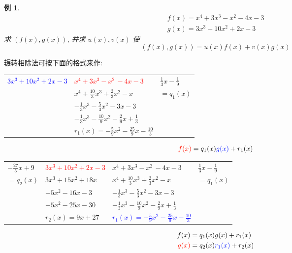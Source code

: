 \documentclass[13pt,fontset=mac]{ctexbeamer}
\newtheorem{exa}{例}
\newcommand{\blue}{\textcolor{blue}}
\newcommand{\red}{\textcolor{red}}
\begin{document}
\begin{frame}
	\begin{exa}
$$
\begin{array}{l}
	f(x)=x^{4}+3 x^{3}-x^{2}-4 x-3 \\
	g(x)=3 x^{3}+10 x^{2}+2 x-3
\end{array}
$$
求 $(f(x), g(x))$, 并求 $u(x), v(x)$ 使
$$
(f(x), g(x))=u(x) f(x)+v(x) g(x)
$$
	\end{exa}
\end{frame}


\begin{frame}
辗转相除法可按下面的格式来作:
	\begin{center}
		\renewcommand\arraystretch{1.3}
		\begin{tabular}{R{3cm} |R{4cm}|L{1.5cm}}
			\blue{$3x^3+10x^2+2x-3$}&\red{$x^4+3x^3-x^2\, -4x-3$}&$\frac{1}{3}x-\frac{1}{9}$\\
			& $x^4+\frac{10}{3}x^3+\frac{2}{3}x^2-x\qquad $& $=q_1(x)$\\
			& $-\frac{1}{3}x^3-\frac{5}{3}x^2-3x-3\, $ & \\
			& $-\frac{1}{3}x^3-\frac{10}{9}x^2-\frac{2}{9}x+\frac{1}{3}$ & \\
			& $r_1(x)= -\frac{5}{9}x^2-\frac{25}{9}x-\frac{10}{3}$ & 
		\end{tabular}
	\end{center}
	
	
	\[
	\red{f(x)}=q_1(x) \blue{g(x)} +r_1(x)
	\]
\end{frame}




\begin{frame}
	\begin{center}
				\renewcommand\arraystretch{1.3}
		\begin{tabular}{R{1.5cm}|R{3cm} |R{4cm}|L{1.7cm}}
$-\frac{27}{5}x+9$ &\red{$3x^3+10x^2+2x-3$}&{$x^4+3x^3-x^2\, -4x-3$}&$\frac{1}{3}x-\frac{1}{9}$\\
$=q_2(x)$ & $3x^3+15x^2+18x\quad $ & $x^4+\frac{10}{3}x^3+\frac{2}{3}x^2-x\qquad $& $=q_1(x)$\\
 &$ -5x^2-16x-3$ & $-\frac{1}{3}x^3-\frac{5}{3}x^2-3x-3\, $ & \\
  &$ -5x^2-25x-30$ & $-\frac{1}{3}x^3-\frac{10}{9}x^2-\frac{2}{9}x+\frac{1}{3}$ & \\
  &$ r_2(x) = 9x+27$ & \blue{$r_1(x) =-\frac{5}{9}x^2-\frac{25}{9}x-\frac{10}{3}$} & 
		\end{tabular}
	\end{center}
	\pause
	
\begin{align*}
	{f(x)} & =q_1(x) {g(x)} +r_1(x)\\
\red{g(x)} & =q_2(x) \blue{r_1(x)} +r_2(x)
\end{align*}

\end{frame}
\end{document}
